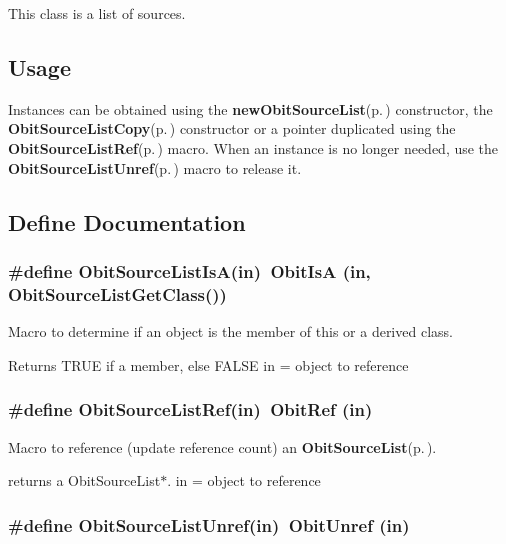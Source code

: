 This class is a list of sources.\subsection{Usage}\label{ObitSourceList_8h_ObitSourceListUsage}
Instances can be obtained using the {\bf new\-Obit\-Source\-List}{\rm (p.\,\pageref{ObitSourceList_8c_a6})} constructor, the {\bf Obit\-Source\-List\-Copy}{\rm (p.\,\pageref{ObitSourceList_8c_a9})} constructor or a pointer duplicated using the {\bf Obit\-Source\-List\-Ref}{\rm (p.\,\pageref{ObitSourceList_8h_a1})} macro. When an instance is no longer needed, use the {\bf Obit\-Source\-List\-Unref}{\rm (p.\,\pageref{ObitSourceList_8h_a0})} macro to release it.

\subsection{Define Documentation}
\subsubsection{\setlength{\rightskip}{0pt plus 5cm}\#define Obit\-Source\-List\-Is\-A(in)\ Obit\-Is\-A (in, Obit\-Source\-List\-Get\-Class())}\label{ObitSourceList_8h_a2}


Macro to determine if an object is the member of this or a derived class. 

Returns TRUE if a member, else FALSE in = object to reference 
\subsubsection{\setlength{\rightskip}{0pt plus 5cm}\#define Obit\-Source\-List\-Ref(in)\ Obit\-Ref (in)}\label{ObitSourceList_8h_a1}


Macro to reference (update reference count) an {\bf Obit\-Source\-List}{\rm (p.\,\pageref{structObitSourceList})}. 

returns a Obit\-Source\-List$\ast$. in = object to reference 
\subsubsection{\setlength{\rightskip}{0pt plus 5cm}\#define Obit\-Source\-List\-Unref(in)\ Obit\-Unref (in)}\label{ObitSourceList_8h_a0}


